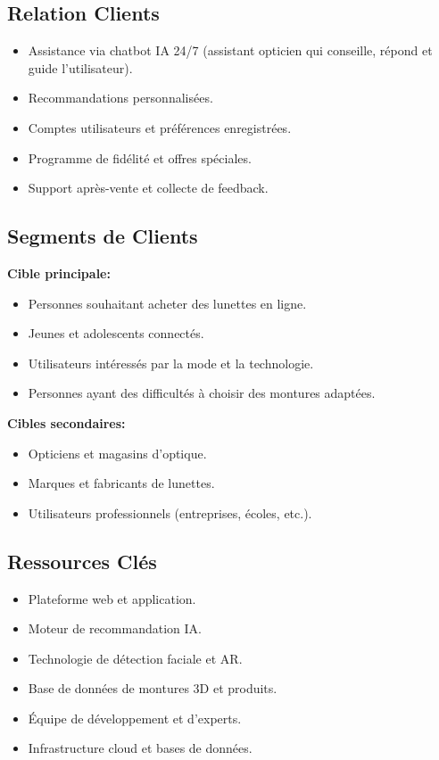 \subsection{Relation Clients}
\begin{itemize}
    \item Assistance via chatbot IA 24/7 (assistant opticien qui conseille, répond et guide l'utilisateur).
    \item Recommandations personnalisées.
    \item Comptes utilisateurs et préférences enregistrées.
    \item Programme de fidélité et offres spéciales.
    \item Support après-vente et collecte de feedback.
\end{itemize}

\subsection{Segments de Clients}
\textbf{Cible principale:}
\begin{itemize}
    \item Personnes souhaitant acheter des lunettes en ligne.
    \item Jeunes et adolescents connectés.
    \item Utilisateurs intéressés par la mode et la technologie.
    \item Personnes ayant des difficultés à choisir des montures adaptées.
\end{itemize}
\textbf{Cibles secondaires:}
\begin{itemize}
    \item Opticiens et magasins d'optique.
    \item Marques et fabricants de lunettes.
    \item Utilisateurs professionnels (entreprises, écoles, etc.).
\end{itemize}

\subsection{Ressources Clés}
\begin{itemize}
    \item Plateforme web et application.
    \item Moteur de recommandation IA.
    \item Technologie de détection faciale et AR.
    \item Base de données de montures 3D et produits.
    \item Équipe de développement et d'experts.
    \item Infrastructure cloud et bases de données.
\end{itemize}

